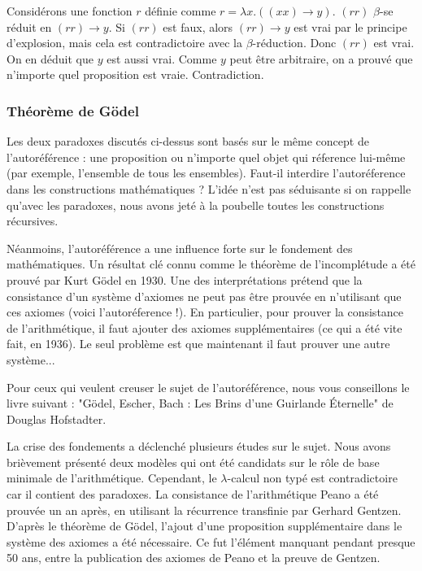 \documentclass[12pt, a4paper]{article}
\begin{document}
{\footnotesize
	Considérons une fonction $r$ définie comme $r=\lambda x.((x x) \to y)$.
	$(r r)$ $\beta$-se réduit en $(r r) \to y$.
	Si $(r r)$ est faux, alors $(r r) \to y$ est vrai par le principe d'explosion, mais cela est contradictoire avec la $\beta$-réduction.
	Donc $(r r)$ est vrai.
	On en déduit que $y$ est aussi vrai.
	Comme $y$ peut être arbitraire, on a prouvé que n'importe quel proposition est vraie.
	Contradiction.
}

\subsubsection*{Théorème de Gödel}
Les deux paradoxes discutés ci-dessus sont basés sur le même concept de l'autoréférence : une proposition ou n'importe quel objet qui réference lui-même (par exemple, l'ensemble de tous les ensembles).
Faut-il interdire l'autoréference dans les constructions mathématiques ?
L'idée n'est pas séduisante si on rappelle qu'avec les paradoxes, nous avons jeté à la poubelle toutes les constructions récursives.

Néanmoins, l'autoréférence a une influence forte sur le fondement des mathématiques.
Un résultat clé connu comme le théorème de l'incomplétude a été prouvé par Kurt Gödel en 1930.
Une des interprétations prétend que la consistance d'un système d'axiomes ne peut pas être prouvée en n'utilisant que ces axiomes (voici l'autoréference !). En particulier, pour prouver la consistance de l'arithmétique, il faut ajouter des axiomes supplémentaires (ce qui a été vite fait, en 1936). Le seul problème est que maintenant il faut prouver une autre système...

{\footnotesize
	Pour ceux qui veulent creuser le sujet de l'autoréférence, nous vous conseillons le livre suivant : "Gödel, Escher, Bach : Les Brins d'une Guirlande Éternelle" de Douglas Hofstadter.
}

La crise des fondements a déclenché plusieurs études sur le sujet.
Nous avons brièvement présenté deux modèles qui ont été candidats sur le rôle de base minimale de l'arithmétique.
Cependant, le $\lambda$-calcul non typé est contradictoire car il contient des paradoxes.
La consistance de l'arithmétique Peano a été prouvée un an après, en utilisant la récurrence transfinie par Gerhard Gentzen.
D'après le théorème de Gödel, l'ajout d'une proposition supplémentaire dans le système des axiomes a été nécessaire.
Ce fut l'élément manquant pendant presque 50 ans, entre la publication des axiomes de Peano et la preuve de Gentzen.
\end{document}
